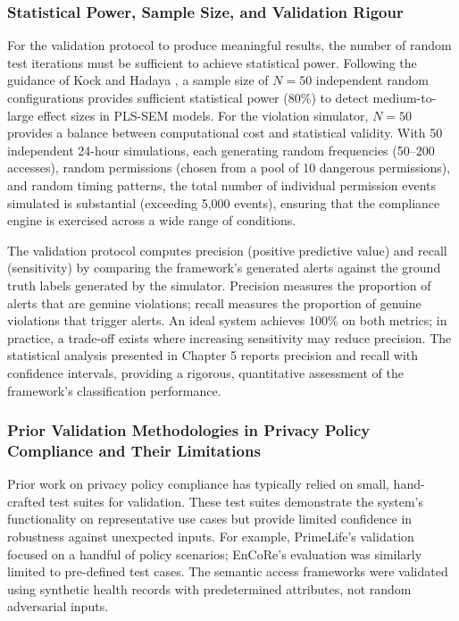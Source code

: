 \subsubsection{Statistical Power, Sample Size, and Validation Rigour}
For the validation protocol to produce meaningful results, the number of random test iterations must be sufficient to achieve statistical power. Following the guidance of Kock and Hadaya \cite{47}, a sample size of \(N=50\) independent random configurations provides sufficient statistical power (80\%) to detect medium-to-large effect sizes in PLS-SEM models. For the violation simulator, \(N=50\) provides a balance between computational cost and statistical validity. With 50 independent 24-hour simulations, each generating random frequencies (50–200 accesses), random permissions (chosen from a pool of 10 dangerous permissions), and random timing patterns, the total number of individual permission events simulated is substantial (exceeding 5,000 events), ensuring that the compliance engine is exercised across a wide range of conditions.

The validation protocol computes precision (positive predictive value) and recall (sensitivity) by comparing the framework's generated alerts against the ground truth labels generated by the simulator. Precision measures the proportion of alerts that are genuine violations; recall measures the proportion of genuine violations that trigger alerts. An ideal system achieves 100\% on both metrics; in practice, a trade-off exists where increasing sensitivity may reduce precision. The statistical analysis presented in Chapter 5 reports precision and recall with confidence intervals, providing a rigorous, quantitative assessment of the framework's classification performance.

\subsubsection{Prior Validation Methodologies in Privacy Policy Compliance and Their Limitations}
Prior work on privacy policy compliance has typically relied on small, hand-crafted test suites for validation. These test suites demonstrate the system's functionality on representative use cases but provide limited confidence in robustness against unexpected inputs. For example, PrimeLife's validation focused on a handful of policy scenarios; EnCoRe's evaluation was similarly limited to pre-defined test cases. The semantic access frameworks \cite{17} were validated using synthetic health records with predetermined attributes, not random adversarial inputs.

